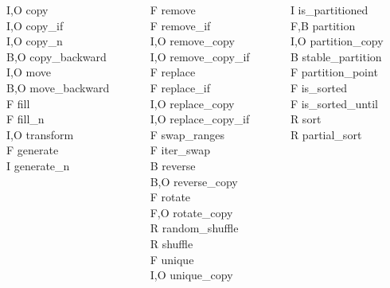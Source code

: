\documentclass{beamer}
\begin{document}
{\begin{columns}[T]
\begin{column}{0.2\textwidth}
      I,O copy \\
      I,O copy\_if \\
      I,O copy\_n \\
      B,O copy\_backward \\
      I,O move \\
      B,O move\_backward \\
      F fill \\
      F fill\_n \\
      I,O transform \\
      F generate \\
      I generate\_n \\
   \end{column}
   \begin{column}{0.2\textwidth}
      F remove \\
      F remove\_if \\
      I,O remove\_copy \\
      I,O remove\_copy\_if \\
      F replace \\
      F replace\_if \\
      I,O replace\_copy \\
      I,O replace\_copy\_if \\
      F swap\_ranges \\
      F iter\_swap \\
      B reverse \\
      B,O reverse\_copy \\
      F rotate \\
      F,O rotate\_copy \\
      R random\_shuffle \\
      R shuffle \\
      F unique \\
      I,O unique\_copy
   \end{column}
   \begin{column}{0.3\textwidth}
      I is\_partitioned \\
      F,B partition \\
      I,O partition\_copy \\
      B stable\_partition \\
      F partition\_point \\
      F is\_sorted \\
      F is\_sorted\_until \\
      R sort \\
      R partial\_sort \\

\end{column}
\end{columns}}
\end{document}
